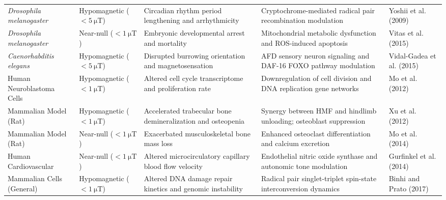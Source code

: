 \begin{table}[t]
\begin{tabular}{p{2.8cm}p{2.2cm}p{3.4cm}p{4.4cm}p{3.0cm}}
\textit{Drosophila melanogaster} & Hypomagnetic ($<\SI{5}{\micro\tesla}$) & Circadian rhythm period lengthening and arrhythmicity & Cryptochrome-mediated radical pair recombination modulation & Yoshii et al. (2009) \citep{Yoshii2009} \\
\textit{Drosophila melanogaster} & Near-null ($<\SI{1}{\micro\tesla}$) & Embryonic developmental arrest and mortality & Mitochondrial metabolic dysfunction and ROS-induced apoptosis & Vitas et al. (2015) \citep{Vitas2015} \\
\textit{Caenorhabditis elegans} & Hypomagnetic ($<\SI{5}{\micro\tesla}$) & Disrupted burrowing orientation and magnetosensation & AFD sensory neuron signaling and DAF-16 FOXO pathway modulation & Vidal-Gadea et al. (2015) \citep{VidalGadea2015} \\
Human Neuroblastoma Cells & Hypomagnetic ($<\SI{1}{\micro\tesla}$) & Altered cell cycle transcriptome and proliferation rate & Downregulation of cell division and DNA replication gene networks & Mo et al. (2012) \citep{Mo2012} \\
Mammalian Model (Rat) & Hypomagnetic ($<\SI{1}{\micro\tesla}$) & Accelerated trabecular bone demineralization and osteopenia & Synergy between HMF and hindlimb unloading; osteoblast suppression & Xu et al. (2012) \citep{Xu2012} \\
Mammalian Model (Rat) & Near-null ($<\SI{1}{\micro\tesla}$) & Exacerbated musculoskeletal bone mass loss & Enhanced osteoclast differentiation and calcium excretion & Mo et al. (2014) \citep{Mo2014} \\
Human Cardiovascular & Near-null ($<\SI{1}{\micro\tesla}$) & Altered microcirculatory capillary blood flow velocity & Endothelial nitric oxide synthase and autonomic tone modulation & Gurfinkel et al. (2014) \citep{Gurfinkel2014} \\
Mammalian Cells (General) & Hypomagnetic ($<\SI{1}{\micro\tesla}$) & Altered DNA damage repair kinetics and genomic instability & Radical pair singlet-triplet spin-state interconversion dynamics & Binhi and Prato (2017) \citep{Binhi2017} \\
\bottomrule
\end{tabular}
\end{table}
